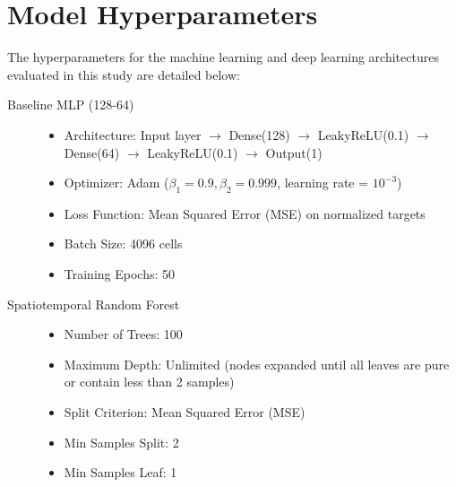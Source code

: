 \documentclass[10pt,twocolumn]{article}
\begin{document}
\section{Model Hyperparameters}
\label{sec:hyperparameters}

The hyperparameters for the machine learning and deep learning architectures evaluated in this study are detailed below:

\begin{description}
    \item[Baseline MLP (128-64)]
    \begin{itemize}
        \item Architecture: Input layer $\to$ Dense(128) $\to$ LeakyReLU(0.1) $\to$ Dense(64) $\to$ LeakyReLU(0.1) $\to$ Output(1)
        \item Optimizer: Adam ($\beta_1 = 0.9, \beta_2 = 0.999$, learning rate = $10^{-3}$)
        \item Loss Function: Mean Squared Error (MSE) on normalized targets
        \item Batch Size: 4096 cells
        \item Training Epochs: 50
    \end{itemize}

    \item[Spatiotemporal Random Forest]
    \begin{itemize}
        \item Number of Trees: 100
        \item Maximum Depth: Unlimited (nodes expanded until all leaves are pure or contain less than 2 samples)
        \item Split Criterion: Mean Squared Error (MSE)
        \item Min Samples Split: 2
        \item Min Samples Leaf: 1
    \end{itemize}


\end{description}
\end{document}
